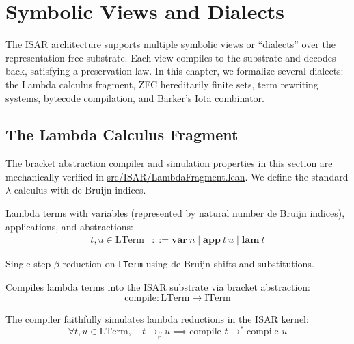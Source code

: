 \chapter{Symbolic Views and Dialects}

The ISAR architecture supports multiple symbolic views or ``dialects'' over the representation-free substrate. Each view compiles to the substrate and decodes back, satisfying a preservation law. In this chapter, we formalize several dialects: the Lambda calculus fragment, ZFC hereditarily finite sets, term rewriting systems, bytecode compilation, and Barker's Iota combinator.

\section{The Lambda Calculus Fragment}

The bracket abstraction compiler and simulation properties in this section are mechanically verified in \url{src/ISAR/LambdaFragment.lean}. We define the standard $\lambda$-calculus with de Bruijn indices.

\begin{definition}
Lambda terms with variables (represented by natural number de Bruijn indices), applications, and abstractions:
\begin{align*}
t, u \in \text{LTerm} &::= \mathbf{var}\ n \mid \mathbf{app}\ t\ u \mid \mathbf{lam}\ t
\end{align*}
\end{definition}

\begin{definition}
Single-step $\beta$-reduction on \texttt{LTerm} using de Bruijn shifts and substitutions.
\end{definition}

\begin{definition}
Compiles lambda terms into the ISAR substrate via bracket abstraction:
$$\text{compile} : \text{LTerm} \to \text{ITerm}$$
\end{definition}

\begin{theorem}
The compiler faithfully simulates lambda reductions in the ISAR kernel:
$$\forall t, u \in \text{LTerm}, \quad t \to_\beta u \implies \text{compile } t \to^* \text{compile } u$$
\end{theorem}

